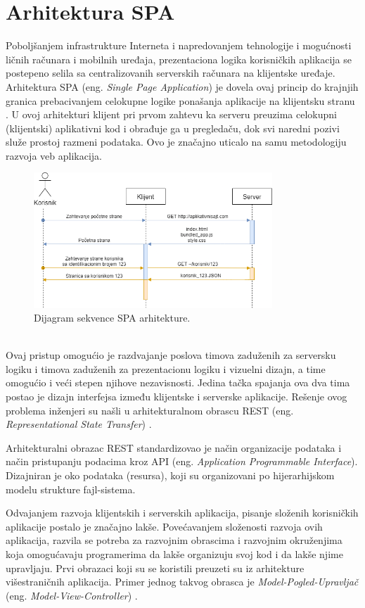 \documentclass[12pt,oneside]{memoir}
\begin{document}
\chapter{Arhitektura SPA}\label{chap:SPA}
Poboljšanjem infrastrukture Interneta i napredovanjem tehnologije i mogućnosti
ličnih računara
i mobilnih uređaja, prezentaciona logika korisničkih aplikacija se postepeno
selila sa centralizovanih
serverskih računara na klijentske uređaje. Arhitektura SPA (eng. \emph{Single Page Application}) je dovela ovaj princip
do krajnjih granica
prebacivanjem celokupne logike ponašanja aplikacije na klijentsku stranu \cite{SPA}. U ovoj arhitekturi klijent
pri prvom zahtevu
ka serveru preuzima celokupni (klijentski) aplikativni kod i obrađuje ga u
pregledaču, dok
svi naredni pozivi služe prostoj razmeni podataka. Ovo je značajno uticalo
na samu metodologiju razvoja veb aplikacija.
\begin{figure}[!ht]
  \centering
  \includegraphics[width=0.8\textwidth]{slike/SPA_Diagram.drawio.png}
  \caption{Dijagram sekvence SPA arhitekture.}
  \label{fig:SPA}
\end{figure}\\
Ovaj pristup omogućio je razdvajanje poslova timova zaduženih za
serversku logiku i timova zaduženih za prezentacionu logiku i vizuelni dizajn,
a time omogućio i veći stepen njihove nezavisnosti.
Jedina tačka spajanja ova dva tima postao je dizajn interfejsa
između klijentske i serverske aplikacije. Rešenje ovog problema inženjeri su našli
u arhitekturalnom obrascu REST (eng. \emph{Representational State Transfer}) \cite{REST}.

Arhitekturalni obrazac REST standardizovao je način organizacije podataka
i način pristupanju podacima kroz API (eng. \emph{Application Programmable Interface}). 
Dizajniran je oko podataka (resursa), koji su organizovani po hijerarhijskom modelu
strukture fajl-sistema.

Odvajanjem razvoja klijentskih i serverskih aplikacija, pisanje složenih korisničkih aplikacije postalo je značajno lakše.
Povećavanjem složenosti razvoja ovih aplikacija,
razvila se potreba za razvojnim obrascima i razvojnim okruženjima koja omogućavaju
programerima da lakše organizuju svoj kod i da lakše njime upravljaju.
Prvi obrazaci koji su se koristili preuzeti su iz arhitekture višestraničnih aplikacija.
Primer jednog takvog obrasca je \emph{Model-Pogled-Upravljač} (eng. \emph{Model-View-Controller}) \cite{MVC}. 
\end{document}
